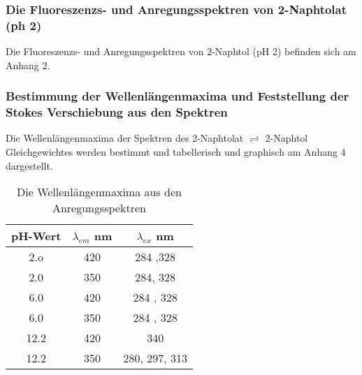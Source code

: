 \documentclass[12pt]{article}
\begin{document}
\subsubsection{Die Fluoreszenzs- und Anregungsspektren von 2-Naphtolat (ph 2)}
Die Fluoreszenzs- und Anregungsspektren von 2-Naphtol (pH 2) befinden sich am Anhang 2.


\subsubsection{Bestimmung der Wellenlängenmaxima und Feststellung der Stokes Verschiebung aus den Spektren}
Die Wellenlängenmaxima der Spektren des 2-Naphtolat $\rightleftharpoons$ 2-Naphtol 
Gleichgewichtes werden bestimmt und tabellerisch und graphisch am Anhang 4 dargestellt. 
\begin{table}[!htbp]
  \centering
  \begin{tabular}{ccc}
    pH-Wert & $\lambda_{em}$ \si{\nano\meter} & $\lambda_{ex}$ \si{\nano\meter}  \\
    \hline
    2.o& 420 & 284 ,328\\
    2.0& 350 & 284, 328\\
    6.0& 420 & 284 , 328\\
    6.0& 350 & 284 , 328\\
    12.2& 420 & 340\\
    12.2& 350 & 280, 297, 313\\
  \end{tabular}
  \caption{Die Wellenlängenmaxima aus den Anregungsspektren}
  \label{table:wm}
\end{table}
\end{document}
